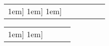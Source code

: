 \documentclass[final]{arxiv/cvpr}
\begin{document}
\begin{figure*}[!t]
\begin{minipage}{\linewidth}
\vspace{-0.2cm}
\centering
    \begin{adjustbox}{width=0.95\textwidth}
        \label{table:architecture}
        \begin{tabular}{cc|cc|cc}
        \Xhline{2\arrayrulewidth}
        \-1em]\Xhline{2\arrayrulewidth}
        \-1em]\Xhline{2\arrayrulewidth}
        \-1em]\Xhline{2\arrayrulewidth}
        \end{tabular}
    \end{adjustbox}
    \vspace{1cm}
\vspace{0.1cm}
    \begin{adjustbox}{width=0.95\textwidth}
        \label{table:hyperparameters}
        \footnotesize
        \begin{tabular}{cccc}
        \Xhline{2\arrayrulewidth}
        \-1em] \Xhline{2\arrayrulewidth}
        \-1em]\Xhline{2\arrayrulewidth}
        \end{tabular}
    \end{adjustbox}
\end{minipage}
\end{figure*}
 
\end{document}
